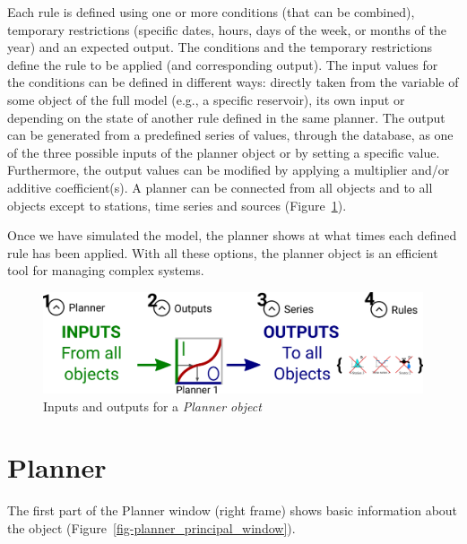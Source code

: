 \documentclass[
  letterpaper,
  DIV=11,
  numbers=noendperiod]{scrreprt}
\begin{document}
Each rule is defined using one or more conditions (that can be
combined), temporary restrictions (specific dates, hours, days of the
week, or months of the year) and an expected output. The conditions and
the temporary restrictions define the rule to be applied (and
corresponding output). The input values for the conditions can be
defined in different ways: directly taken from the variable of some
object of the full model (e.g., a specific reservoir), its own input or
depending on the state of another rule defined in the same planner. The
output can be generated from a predefined series of values, through the
database, as one of the three possible inputs of the planner object or
by setting a specific value. Furthermore, the output values can be
modified by applying a multiplier and/or additive coefficient(s). A
planner can be connected from all objects and to all objects except to
stations, time series and sources
(Figure~\ref{fig-inputs_outputs_planner}).

Once we have simulated the model, the planner shows at what times each
defined rule has been applied. With all these options, the planner
object is an efficient tool for managing complex systems.

\begin{figure}

{\centering \includegraphics{./figures/fig-inputs_outputs_planner.png}

}

\caption{\label{fig-inputs_outputs_planner}Inputs and outputs for a
\emph{Planner object}}

\end{figure}

\hypertarget{planner}{%
\section{Planner}\label{planner}}

The first part of the Planner window (right frame) shows basic
information about the object
(Figure~\ref{fig-planner_principal_window}).
\end{document}
